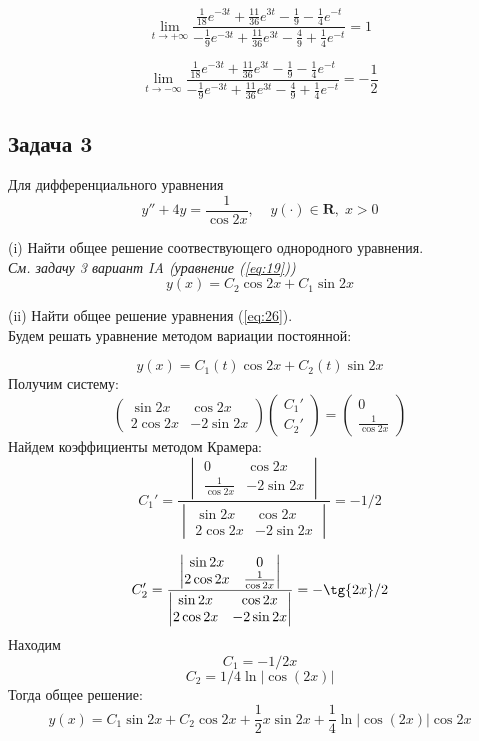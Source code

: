 \documentclass[a4paper, 12pt]{article}
\begin{document}
\[\lim_{t\rightarrow+\infty}\frac{\frac 1 {18}e^{-3t}+\frac{11} {36} e^{3t}- \frac 1 9 -\frac 1 4 e^{-t}}{-\frac 1 9 e^{-3t}+\frac{11}{36}e^{3t}-\frac 4 9 + \frac 1 4 e^{-t}}= 1\]

\[\lim_{t\rightarrow-\infty}\frac{\frac 1 {18}e^{-3t}+\frac{11} {36} e^{3t}- \frac 1 9 -\frac 1 4 e^{-t}}{-\frac 1 9 e^{-3t}+\frac{11}{36}e^{3t}-\frac 4 9 + \frac 1 4 e^{-t}}=-\frac 1 2\]





	\subsection {Задача 3}
Для дифференциального уравнения 
\begin{equation}
y''+4y=\frac{1}{\cos{2x}}, \;\;\;\; y(\cdot)\in \textbf{R},\; x>0
\label{eq:26}
\end{equation}

(i) Найти общее решение соотвествующего однородного уравнения.\\
\textit{См. задачу 3 вариант IA (уравнение (\ref{eq:19}))}\\
\[y(x) =C_2\cos{2x}+C_1\sin{2x}\]


(ii) Найти общее решение уравнения (\ref{eq:26}).\\
Будем решать уравнение методом вариации постоянной:

\[y(x)= C_1(t)\cos{2x}+C_2(t)\sin{2x}\]
Получим систему:
\[ \left(
\begin{array}{cc}
\sin{2x} & \cos{2x} \\
2\cos{2x} & -2\sin{2x}
\end{array}
\right) \left(
\begin{array}{c}
C_1' \\
C_2'
\end{array} 
\right)= \left(
\begin{array}{c}
0 \\
\frac{1}{\cos{2x}}
\end{array}
\right) \]
Найдем коэффициенты методом Крамера:
\[C_1' = \frac{\begin{vmatrix}
0 & \cos{2x} \\
\frac{1}{\cos{2x}} & -2\sin{2x}
\end{vmatrix}}{\begin{vmatrix}
\sin{2x} & \cos{2x} \\
2\cos{2x} & -2\sin{2x}
\end{vmatrix}}= -1/2\]

\[C_2' = \frac{\begin{vmatrix}
\sin{2x} & 0 \\
2\cos{2x} & \frac{1}{\cos{2x}}
\end{vmatrix}}{\begin{vmatrix}
\sin{2x} & \cos{2x} \\
2\cos{2x} & -2\sin{2x}
\end{vmatrix}}= -\tg{2x}/2\]
Находим 
\[C_1 = -1/2x\]
\[C_2=1/4\ln{|\cos{(2x)}|}\]
Тогда общее решение:
\[y(x) = C_1\sin{2x}+C_2\cos{2x}+\frac {1} {2} x\sin{2x}+\frac 1 4 \ln{|\cos{(2x)}|}\cos{2x}\]
\end{document}
